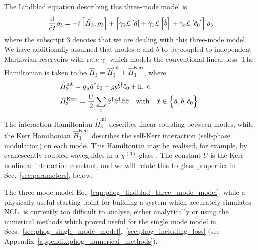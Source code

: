 The Lindblad equation describing this three-mode model is
\begin{equation}\label{eqn:phog_lindblad_three_mode_model}
\frac{\mathrm{d}}{\mathrm{d}t} \rho_3 = - i \left[ \hat{H}_3, \rho_3\right] + \left[ \gamma_1 \mathcal{L}\left[\hat{a}\right] + \gamma_1 \mathcal{L}\left[\hat{b}\right] + \gamma_c \mathcal{L}\left[\hat{c}_0\right]\right] \rho_3
\end{equation}
where the subscript $3$ denotes that we are dealing with this three-mode model. We have additionally assumed that modes $a$ and $b$ to be coupled to independent Markovian reservoirs with rate $\gamma_1$ which models the conventional linear loss. The Hamiltonian is taken to be $\hat{H}_3 = \hat{H}_3^{\text{int}} + \hat{H}_3^{\text{Kerr}}$, where
\begin{align}\label{eqn:phog_three_mode_hamiltonian}
&\hat{H}_3^{\text{int}} = g_a \hat{a}^\dagger \hat{c}_0 + g_b \hat{b}^\dagger \hat{c}_0 + \hc \notag \\
%
&\hat{H}_3^{\text{Kerr}} = \frac{U}{2} \sum_{x} \hat{x}^\dagger \hat{x}^\dagger \hat{x} \hat{x} \qq{with} \hat{x} \in \left\{\hat{a}, \hat{b}, \hat{c}_0\right\}.
\end{align}
The interaction Hamiltonian $\hat{H}_3^{\text{int}}$ describes linear coupling between modes, while the Kerr Hamiltonian $\hat{H}_3^{\text{Kerr}}$ describes the self-Kerr interaction (self-phase modulation) %
on each mode. This Hamiltonian may be realised, for example, by evanescently coupled waveguides in a $\chi^{\left(3\right)}$ glass \cite{Imoto1985, Kitagawa1986, Drummond1980}. The constant $U$ is the Kerr nonlinear interaction constant, and we will relate this to glass properties in Sec.~\ref{sec:parameters}, below.

The three-mode model Eq.~\ref{eqn:phog_lindblad_three_mode_model}, while a physically useful starting point for building a system which accurately simulates NCL, is currently too difficult to analyse, either analytically or using the numerical methods which proved useful for the single mode model in Secs.~\ref{sec:phog_single_mode_model},~\ref{sec:phog_including_loss} (see Appendix~\ref{appendix:phog_numerical_methods}). 

